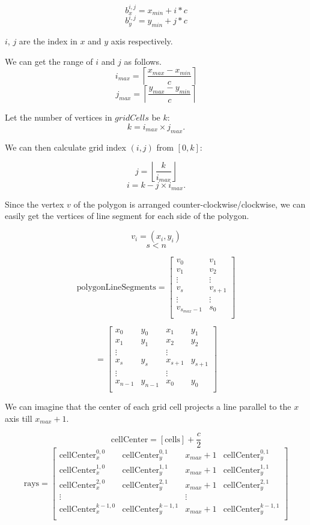 $$b^{i,j}_x = x_{min} + i * c$$
$$b^{i,j}_y = y_{min} + j * c$$

$i$, $j$ are the index in $x$  and $y$ axis respectively.


We can get the range of $i$ and $j$ as follows.
$$i_{max} = \left\lceil\frac{x_{max} - x_{min}}{c}\right\rceil $$
$$j_{max} = \left\lceil\frac{y_{max} - y_{min}}{c}\right\rceil$$

Let the number of vertices in $gridCells$ be $k$:
$$ k = i_{max} \times j_{max}.$$


We can then calculate grid index $(i,j)$ from $[0, k]$:

$$j = \left\lfloor\frac{k}{i_{max}}\right\rfloor$$
$$i = k  - j \times i_{max}.$$

Since the vertex $v$ of the polygon is arranged counter-clockwise/clockwise, we can easily get the vertices of line segment for each side of the polygon.

$$v_i = (x_i, y_i)$$
$$s < n$$

$$\text{polygonLineSegments}=\begin{bmatrix}
v_0 & v_1 \\
v_1 & v_2 \\
\vdots & \vdots \\
v_s & v_{s+1} \\
\vdots & \vdots \\
v_{s_{max}-1} & s_0 \\
\end{bmatrix}$$

$$=\begin{bmatrix}
x_0 & y_0 & x_1 & y_1 \\
x_1 & y_1 & x_2 & y_2\\
\vdots && \vdots \\
x_s & y_s & x_{s+1} & y_{s+1} \\
\vdots && \vdots \\
x_{n-1} & y_{n-1} & x_{0} & y_{0} \\
\end{bmatrix}$$

We can imagine that the center of each grid cell projects a line parallel to the $x$ axis till $x_{max} + 1$.

$$\text{cellCenter} = [\text{cells}] +  \frac{c}{2}$$
$$\text{rays} = \begin{bmatrix}
\text{cellCenter}_x^{0,0} & \text{cellCenter}_y^{0,1} & x_{max} + 1 & \text{cellCenter}_y^{0,1} \\
\text{cellCenter}_x^{1,0} & \text{cellCenter}_y^{1,1} & x_{max} + 1 & \text{cellCenter}_y^{1,1} \\
\text{cellCenter}_x^{2,0} & \text{cellCenter}_y^{2,1} & x_{max} + 1 & \text{cellCenter}_y^{2,1} \\
\vdots && \vdots \\
\text{cellCenter}_x^{k-1,0} & \text{cellCenter}_y^{k-1,1} & x_{max} + 1 & \text{cellCenter}_y^{k-1,1} \\
\end{bmatrix}
$$


